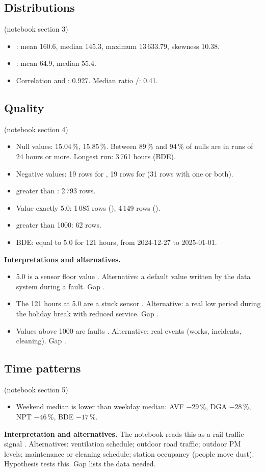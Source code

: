 \documentclass[11pt]{article}
\begin{document}
\subsection{Distributions} \tObserved{} (notebook section 3)
\begin{itemize}
  \item \pmten: mean 160.6, median 145.3, maximum 13\,633.79, skewness 10.38.
  \item \pmtwofive: mean 64.9, median 55.4.
  \item Correlation \pmten{} and \pmtwofive: 0.927. Median ratio \pmtwofive/\pmten: 0.41.
\end{itemize}

\subsection{Quality} \tObserved{} (notebook section 4)
\begin{itemize}
  \item Null values: \pmten{} 15.04\,\%, \pmtwofive{} 15.85\,\%. Between 89\,\% and 94\,\% of nulls are in runs of 24 hours or more. Longest run: 3\,761 hours (BDE).
  \item Negative values: 19 rows for \pmten, 19 rows for \pmtwofive{} (31 rows with one or both).
  \item \pmtwofive{} greater than \pmten: 2\,793 rows.
  \item Value exactly 5.0: 1\,085 rows (\pmten), 4\,149 rows (\pmtwofive).
  \item \pmten{} greater than 1000: 62 rows.
  \item BDE: \pmten{} equal to 5.0 for 121 hours, from 2024-12-27 to 2025-01-01.
\end{itemize}
\textbf{Interpretations and alternatives.}
\begin{itemize}
  \item 5.0 is a sensor floor value \tInterp. Alternative: a default value written by the data system during a fault. Gap .
  \item The 121 hours at 5.0 are a stuck sensor \tInterp. Alternative: a real low period during the holiday break with reduced service. Gap .
  \item Values above 1000 are faults \tInterp. Alternative: real events (works, incidents, cleaning). Gap .
\end{itemize}

\subsection{Time patterns} \tObserved{} (notebook section 5)
\begin{itemize}
  \item Weekend median \pmten{} is lower than weekday median: AVF $-29$\,\%, DGA $-28$\,\%, NPT $-46$\,\%, BDE $-17$\,\%.
\end{itemize}
\textbf{Interpretation and alternatives.}
The notebook reads this as a rail-traffic signal \tInterp.
Alternatives: ventilation schedule; outdoor road traffic; outdoor PM levels; maintenance or cleaning schedule; station occupancy (people move dust).
Hypothesis  tests this. Gap  lists the data needed.
\end{document}
